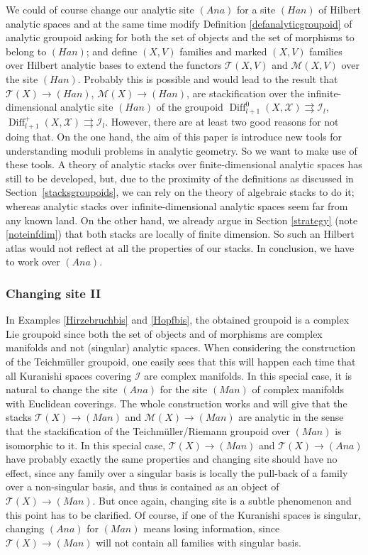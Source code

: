 \documentclass[10pt]{amsart}
\let\mathcal\mathscr
\newcommand{\Ana}{\mathit{Ana}}
\newcommand{\Han}{\mathit{Han}}
\newcommand{\Man}{\mathit{Man}}
\DeclareMathOperator{\Diff}{Diff}
\theoremstyle{plain}
\theoremstyle{definition}
\theoremstyle{remark}
\numberwithin{equation}{section}
\newcommand{\cI}{\mathcal{I}}
\begin{document}
We could of course change our analytic site $(\Ana)$ for a site $(\Han)$ of Hilbert analytic spaces and at the same time modify Definition \ref{defanalyticgroupoid} of analytic groupoid asking for both the set of objects and the set of morphisms to belong to $(\Han)$; and define $(X,V)$ families and marked $(X,V)$ families over Hilbert analytic bases to extend the functors $\mathcal T(X,V)$ and $\mathcal M(X,V)$ over the site $(\Han)$. Probably this is possible and would lead to the result that $\mathcal T(X)\to (\Han)$, \resp $\mathcal M(X)\to (\Han)$, are stackification over the infinite-dimensional analytic site $(\Han)$ of the groupoid $\Diff^0_{l+1} (X,\mathcal X)\rightrightarrows \cI_l$, \resp $\Diff^+_{l+1} (X,\mathcal X)\rightrightarrows \cI_l$. However, there are at least two good reasons for not doing that. On the one hand, the aim of this paper is introduce new tools for understanding moduli problems in analytic geometry. So we want to make use of these tools. A theory of analytic stacks over finite-dimensional analytic spaces has still to be developed, but, due to the proximity of the definitions as discussed in Section~\ref{stacksgroupoids}, we can rely on the theory of algebraic stacks to do it; whereas analytic stacks over infinite-dimensional analytic spaces seem far from any known land. On the other hand, we already argue in Section \ref{strategy} (\cf note \ref{noteinfdim}) that both stacks are locally of finite dimension. So such an Hilbert atlas would not reflect at all the properties of our stacks. In conclusion, we have to work over $(\Ana)$.

\subsubsection*{Changing site II} In Examples \ref{Hirzebruchbis} and \ref{Hopfbis}, the obtained groupoid is a complex Lie groupoid since both the set of objects and of morphisms are complex manifolds and not (singular) analytic spaces. When considering the construction of the Teichmüller groupoid, one easily sees that this will happen each time that all Kuranishi spaces covering $\cI$ are complex manifolds. In this special case, it is natural to change the site $(\Ana)$ for the site $(\Man)$ of complex manifolds with Euclidean coverings. The whole construction works and will give that the stacks $\mathcal T(X)\to (\Man)$ and $\mathcal M(X)\to (\Man)$ are analytic in the sense that the stackification of the Teichmüller/Riemann groupoid
over $(\Man)$ is isomorphic to it. In this special case, $\mathcal T(X)\to (\Man)$ and $\mathcal T(X)\to (\Ana)$ have probably exactly the same properties and changing site should have no effect, since any family over a singular basis is locally the pull-back of a family over a non-singular basis, and thus is contained as an object of $\mathcal T(X)\to (\Man)$. But once again, changing site is a subtle phenomenon and this point has to be clarified. Of course, if one of the Kuranishi spaces is singular, changing $(\Ana)$ for $(\Man)$ means losing information, since $\mathcal T(X)\to (\Man)$ will not contain all families with singular basis.
\end{document}
